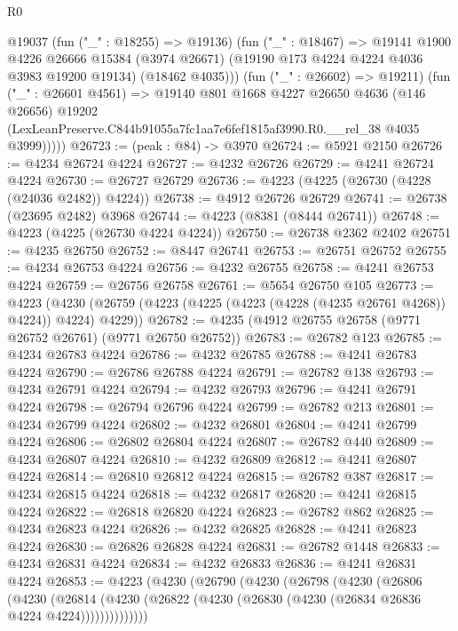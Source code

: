 \begin{lexlean}{R0}
\begin{coremodule}
            @19037
            (fun ("_" : @18255) => @19136)
            (fun ("_" : @18467) =>
            @19141
              @1900
              @4226
              @26666
              @15384
              (@3974 @26671)
              (@19190 @173 @4224 @4224 @4036 @3983 @19200 @19134)
              (@18462 @4035)))
          (fun ("_" : @26602) => @19211)
          (fun ("_" : @26601 @4561) =>
          @19140
            @801
            @1668
            @4227
            @26650
            @4636
            (@146 @26656)
            @19202
            (LexLeanPreserve.C844b91055a7fc1aa7e6fef1815af3990.R0.__rel_38 @4035 @3999)))))
@26723 := (peak : @84) -> @3970
@26724 := @5921 @2150
@26726 := @4234 @26724 @4224
@26727 := @4232 @26726
@26729 := @4241 @26724 @4224
@26730 := @26727 @26729
@26736 := @4223 (@4225 (@26730 (@4228 (@24036 @2482)) @4224))
@26738 := @4912 @26726 @26729
@26741 := @26738 (@23695 @2482) @3968
@26744 := @4223 (@8381 (@8444 @26741))
@26748 := @4223 (@4225 (@26730 @4224 @4224))
@26750 := @26738 @2362 @2402
@26751 := @4235 @26750
@26752 := @8447 @26741
@26753 := @26751 @26752
@26755 := @4234 @26753 @4224
@26756 := @4232 @26755
@26758 := @4241 @26753 @4224
@26759 := @26756 @26758
@26761 := @5654 @26750 @105
@26773 := @4223
    (@4230 (@26759 (@4223 (@4225 (@4223 (@4228 (@4235 @26761 @4268)) @4224)) @4224) @4229))
@26782 := @4235 (@4912 @26755 @26758 (@9771 @26752 @26761) (@9771 @26750 @26752))
@26783 := @26782 @123
@26785 := @4234 @26783 @4224
@26786 := @4232 @26785
@26788 := @4241 @26783 @4224
@26790 := @26786 @26788 @4224
@26791 := @26782 @138
@26793 := @4234 @26791 @4224
@26794 := @4232 @26793
@26796 := @4241 @26791 @4224
@26798 := @26794 @26796 @4224
@26799 := @26782 @213
@26801 := @4234 @26799 @4224
@26802 := @4232 @26801
@26804 := @4241 @26799 @4224
@26806 := @26802 @26804 @4224
@26807 := @26782 @440
@26809 := @4234 @26807 @4224
@26810 := @4232 @26809
@26812 := @4241 @26807 @4224
@26814 := @26810 @26812 @4224
@26815 := @26782 @387
@26817 := @4234 @26815 @4224
@26818 := @4232 @26817
@26820 := @4241 @26815 @4224
@26822 := @26818 @26820 @4224
@26823 := @26782 @862
@26825 := @4234 @26823 @4224
@26826 := @4232 @26825
@26828 := @4241 @26823 @4224
@26830 := @26826 @26828 @4224
@26831 := @26782 @1448
@26833 := @4234 @26831 @4224
@26834 := @4232 @26833
@26836 := @4241 @26831 @4224
@26853 := @4223
    (@4230
      (@26790
        (@4230
          (@26798
            (@4230
              (@26806
                (@4230
                  (@26814
                    (@4230 (@26822 (@4230 (@26830 (@4230 (@26834 @26836 @4224 @4224))))))))))))))

\end{coremodule}
\end{lexlean}
